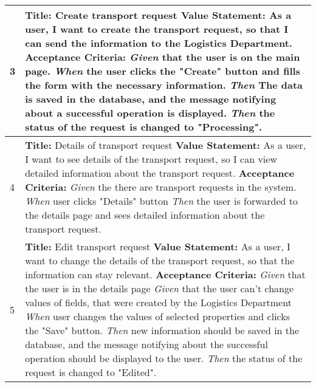 \documentclass[a4paper]{article}
\begin{document}
\begin{longtable}[c]{|p{0.5cm}||p{}|}
            \\
             \hline
              3 &
                 \textbf{Title:}  Create transport request  \newline
                 \textbf{Value Statement:} As a user, I want to create the transport request, so that I can send the information to the Logistics Department.  \newline
                \textbf{Acceptance Criteria:} \newline
                 \emph{Given} that the user is on the main page.\newline 
                 \emph{When} the user clicks the "Create" button and fills the form with the necessary information. \newline
                 \emph{Then} The data is saved in the database, and the message notifying about a successful operation is displayed. \newline
                 \emph{Then} the status of the request is changed to "Processing".
            \\
              \hline
              4 &
                 \textbf{Title:}  Details of transport request  \newline
                 \textbf{Value Statement:} As a user, I want to see details of the transport request, so I can view detailed information about the transport request.  \newline
                \textbf{Acceptance Criteria:} \newline
                 \emph{Given} the there are transport requests in the system.\newline 
                 \emph{When} user clicks "Details" button \newline
                 \emph{Then} the user is forwarded to the details page and sees detailed information about the transport request.\\
              \hline
              5 & 
                 \textbf{Title:} Edit transport request  \newline
                 \textbf{Value Statement:} As a user, I want to change the details of the transport request, so that the information can stay relevant.  \newline
                 \textbf{Acceptance Criteria:} \newline
                 \emph{Given} that the user is in the details page \newline 
                 \emph{Given} that the user can't change values of fields, that were created by the Logistics Department \newline 
                 \emph{When} user changes the values of selected properties and clicks the "Save" button. \newline
                 \emph{Then} new information should be saved in the database, and the message notifying about the successful operation should be displayed to the user. \newline
                 \emph{Then} the status of the request is changed to "Edited".


\end{longtable}
\end{document}
